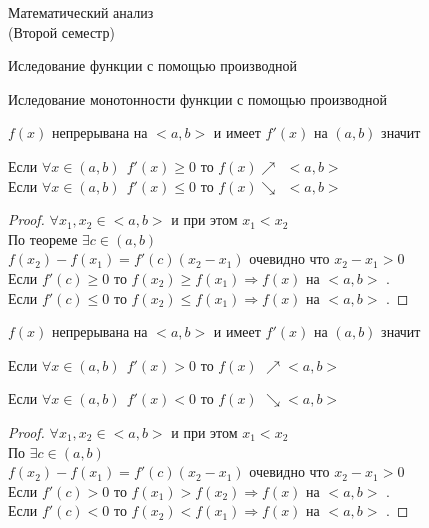 \begin{title}
  Математический анализ\\
  (Второй семестр)
\end{title}

\begin{title}
  Иследование функции с помощью производной
\end{title}

\begin{title}[\Large]
  Иследование монотонности функции с помощью производной
\end{title}

\begin{theorem}
  $f(x)$ непрерывана на $<a,b>$ и имеет $f'(x)$ на $(a,b)$ значит

  Если $\forall x \in (a,b) ~~ f'(x) \ge 0 $ то $f(x) \nearrow ~~ <a,b>$\\
  Если $\forall x \in (a,b) ~~ f'(x) \le 0 $ то $f(x) \searrow ~~ <a,b>$
\end{theorem}

\begin{proof}
  $\forall x_1, x_2 \in <a,b>$ и при этом $x_1 < x_2 $\\
  По теореме  $\exists c \in (a,b)$\\
  $f(x_2) - f(x_1) = f'(c)(x_2 - x_1)$ очевидно что $x_2 - x_1 > 0 $\\
  Если $f'(c) \ge 0$ то $f(x_2) \ge f(x_1) \Rightarrow f(x)$ на $<a,b>$
  .\\
  Если $f'(c) \le 0$ то $f(x_2) \le f(x_1) \Rightarrow f(x)$ на $<a,b>$
  .
\end{proof}

\begin{theorem}
  $f(x)$ непрерывана на $<a,b>$ и имеет $f'(x)$ на $(a,b)$ значит

  Если $\forall x \in (a, b) ~~ f'(x) > 0$ то $f(x)$ 
  $\nearrow <a,b>$

  Если $\forall x \in (a, b) ~~ f'(x) < 0$ то $f(x)$ 
  $\searrow <a,b>$
\end{theorem}

\begin{proof}
  $\forall x_1, x_2 \in <a,b>$ и при этом $x_1 < x_2 $\\
  По  $\exists c \in (a,b)$\\
  $f(x_2) - f(x_1) = f'(c)(x_2 - x_1)$ очевидно что $x_2 - x_1 > 0$\\
  Если $f'(c) > 0$ то $f(x_1) > f(x_2) \Rightarrow f(x)$ на $<a,b>$
  .\\
  Если $f'(c) < 0$ то $f(x_2) < f(x_1) \Rightarrow f(x)$ на $<a,b>$
  .
\end{proof}

